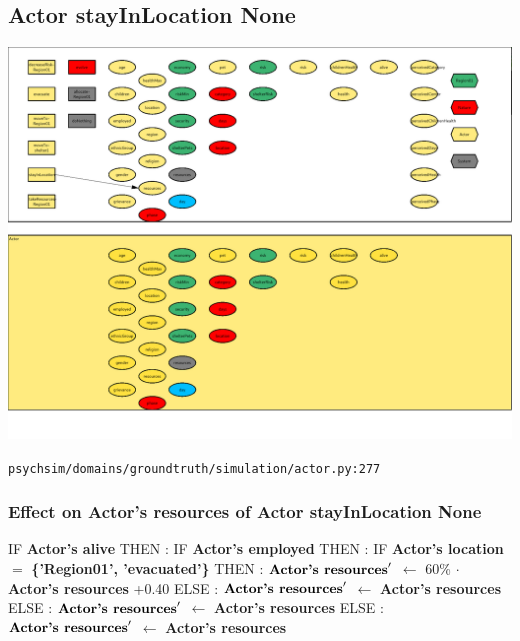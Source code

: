 \documentclass{article}%
\begin{document}
\subsection{Actor stayInLocation None}%
\label{subsec:Actor stayInLocation None}%
\includegraphics[width=\textwidth]{images/Actor-stayInLocation.png}%
\begin{flushleft}%
\verb|psychsim/domains/groundtruth/simulation/actor.py:277|%
\end{flushleft}%
\subsubsection{Effect on Actor's resources of Actor stayInLocation None}%
\label{ssubsec:Effect on Actor's resources of Actor stayInLocation None}%
\begin{flushleft}%
IF %
\textbf{Actor's alive}%
\linebreak%
\hspace*{2em}%
THEN %
: %
IF %
\textbf{Actor's employed}%
\linebreak%
\hspace*{4em}%
THEN %
: %
IF %
\textbf{Actor's location}%
$=$%
\textbf{\{'Region01', 'evacuated'\}}%
\linebreak%
\hspace*{6em}%
THEN %
: %
$\mbox{\textbf{Actor's resources}} '$%
$\leftarrow$%
60\%%
$\cdot$%
\textbf{Actor's resources}%
+0.40%
\linebreak%
\hspace*{6em}%
ELSE %
: %
$\mbox{\textbf{Actor's resources}} '$%
$\leftarrow$%
\textbf{Actor's resources}%
\linebreak%
\hspace*{4em}%
ELSE %
: %
$\mbox{\textbf{Actor's resources}} '$%
$\leftarrow$%
\textbf{Actor's resources}%
\linebreak%
\hspace*{2em}%
ELSE %
: %
$\mbox{\textbf{Actor's resources}} '$%
$\leftarrow$%
\textbf{Actor's resources}%
\end{flushleft}
\end{document}
